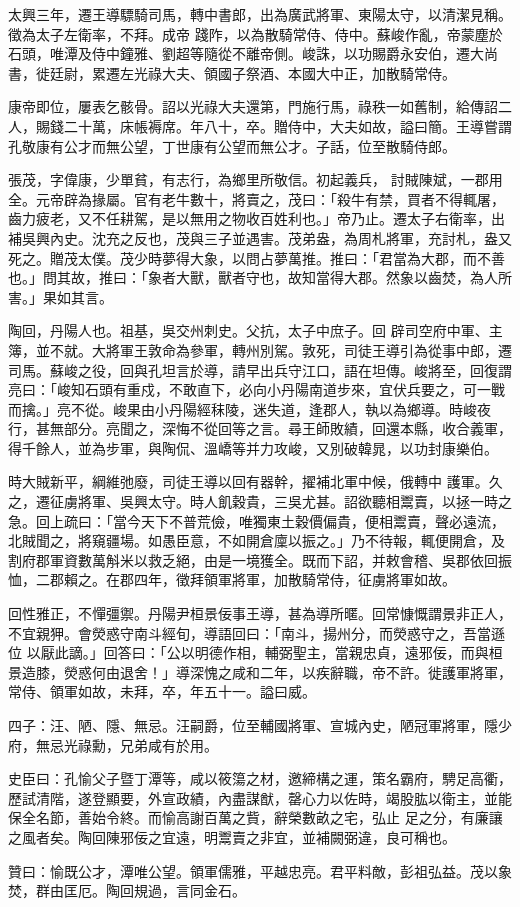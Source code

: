 \begin{pinyinscope}
 太興三年，遷王導驃騎司馬，轉中書郎，出為廣武將軍、東陽太守，以清潔見稱。徵為太子左衛率，不拜。成帝
 踐阼，以為散騎常侍、侍中。蘇峻作亂，帝蒙塵於石頭，唯潭及侍中鐘雅、劉超等隨從不離帝側。峻誅，以功賜爵永安伯，遷大尚書，徙廷尉，累遷左光祿大夫、領國子祭酒、本國大中正，加散騎常侍。



 康帝即位，屢表乞骸骨。詔以光祿大夫還第，門施行馬，祿秩一如舊制，給傳詔二人，賜錢二十萬，床帳褥席。年八十，卒。贈侍中，大夫如故，謚曰簡。王導嘗謂孔敬康有公才而無公望，丁世康有公望而無公才。子話，位至散騎侍郎。



 張茂，字偉康，少單貧，有志行，為鄉里所敬信。初起義兵，
 討賊陳斌，一郡用全。元帝辟為掾屬。官有老牛數十，將賣之，茂曰：「殺牛有禁，買者不得輒屠，齒力疲老，又不任耕駕，是以無用之物收百姓利也。」帝乃止。遷太子右衛率，出補吳興內史。沈充之反也，茂與三子並遇害。茂弟盎，為周札將軍，充討札，盎又死之。贈茂太僕。茂少時夢得大象，以問占夢萬推。推曰：「君當為大郡，而不善也。」問其故，推曰：「象者大獸，獸者守也，故知當得大郡。然象以齒焚，為人所害。」果如其言。



 陶回，丹陽人也。祖基，吳交州刺史。父抗，太子中庶子。回
 辟司空府中軍、主簿，並不就。大將軍王敦命為參軍，轉州別駕。敦死，司徒王導引為從事中郎，遷司馬。蘇峻之役，回與孔坦言於導，請早出兵守江口，語在坦傳。峻將至，回復謂亮曰：「峻知石頭有重戍，不敢直下，必向小丹陽南道步來，宜伏兵要之，可一戰而擒。」亮不從。峻果由小丹陽經秣陵，迷失道，逢郡人，執以為鄉導。時峻夜行，甚無部分。亮聞之，深悔不從回等之言。尋王師敗績，回還本縣，收合義軍，得千餘人，並為步軍，與陶侃、溫嶠等并力攻峻，又別破韓晁，以功封康樂伯。



 時大賊新平，綱維弛廢，司徒王導以回有器幹，擢補北軍中候，俄轉中
 護軍。久之，遷征虜將軍、吳興太守。時人飢穀貴，三吳尤甚。詔欲聽相鬻賣，以拯一時之急。回上疏曰：「當今天下不普荒儉，唯獨東土穀價偏貴，便相鬻賣，聲必遠流，北賊聞之，將窺疆場。如愚臣意，不如開倉廩以振之。」乃不待報，輒便開倉，及割府郡軍資數萬斛米以救乏絕，由是一境獲全。既而下詔，并敕會稽、吳郡依回振恤，二郡賴之。在郡四年，徵拜領軍將軍，加散騎常侍，征虜將軍如故。



 回性雅正，不憚彊禦。丹陽尹桓景佞事王導，甚為導所暱。回常慷慨謂景非正人，不宜親狎。會熒惑守南斗經旬，導語回曰：「南斗，揚州分，而熒惑守之，吾當遜位
 以厭此謫。」回答曰：「公以明德作相，輔弼聖主，當親忠貞，遠邪佞，而與桓景造膝，熒惑何由退舍！」導深愧之咸和二年，以疾辭職，帝不許。徙護軍將軍，常侍、領軍如故，未拜，卒，年五十一。謚曰威。



 四子：汪、陋、隱、無忌。汪嗣爵，位至輔國將軍、宣城內史，陋冠軍將軍，隱少府，無忌光祿勳，兄弟咸有於用。



 史臣曰：孔愉父子暨丁潭等，咸以筱簜之材，邀締構之運，策名霸府，騁足高衢，歷試清階，遂登顯要，外宣政績，內盡謀猷，罄心力以佐時，竭股肱以衛主，並能保全名節，善始令終。而愉高謝百萬之貲，辭榮數畝之宅，弘止
 足之分，有廉讓之風者矣。陶回陳邪佞之宜遠，明鬻賣之非宜，並補闕弼違，良可稱也。



 贊曰：愉既公才，潭唯公望。領軍儒雅，平越忠亮。君平料敵，彭祖弘益。茂以象焚，群由匡厄。陶回規過，言同金石。



\end{pinyinscope}